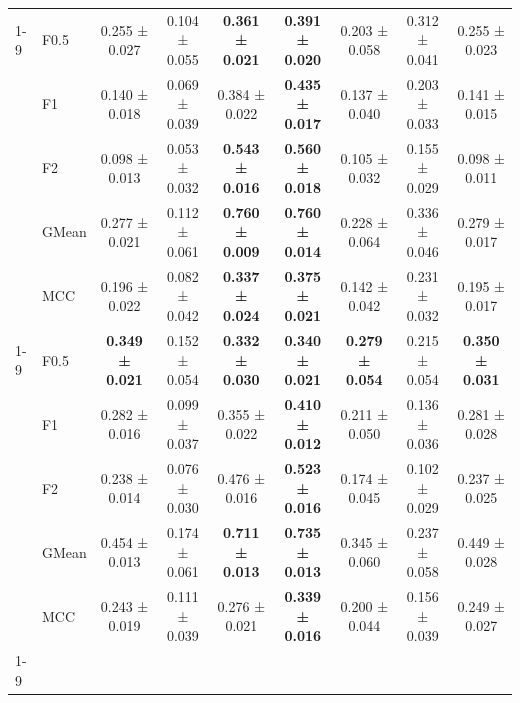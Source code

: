 \begin{table}[H]
{\begin{tabular}{llccccccc}
\cline{1-9}
\multirow[t]{5}{*}{TabPFN} & F0.5 & 0.255 ± 0.027 & 0.104 ± 0.055 & \textbf{0.361 ± 0.021} & \textbf{0.391 ± 0.020} & 0.203 ± 0.058 & 0.312 ± 0.041 & 0.255 ± 0.023 \\
 & F1 & 0.140 ± 0.018 & 0.069 ± 0.039 & 0.384 ± 0.022 & \textbf{0.435 ± 0.017} & 0.137 ± 0.040 & 0.203 ± 0.033 & 0.141 ± 0.015 \\
 & F2 & 0.098 ± 0.013 & 0.053 ± 0.032 & \textbf{0.543 ± 0.016} & \textbf{0.560 ± 0.018} & 0.105 ± 0.032 & 0.155 ± 0.029 & 0.098 ± 0.011 \\
 & GMean & 0.277 ± 0.021 & 0.112 ± 0.061 & \textbf{0.760 ± 0.009} & \textbf{0.760 ± 0.014} & 0.228 ± 0.064 & 0.336 ± 0.046 & 0.279 ± 0.017 \\
 & MCC & 0.196 ± 0.022 & 0.082 ± 0.042 & \textbf{0.337 ± 0.024} & \textbf{0.375 ± 0.021} & 0.142 ± 0.042 & 0.231 ± 0.032 & 0.195 ± 0.017 \\
\cline{1-9}
\multirow[t]{5}{*}{XGBoost} & F0.5 & \textbf{0.349 ± 0.021} & 0.152 ± 0.054 & \textbf{0.332 ± 0.030} & \textbf{0.340 ± 0.021} & \textbf{0.279 ± 0.054} & 0.215 ± 0.054 & \textbf{0.350 ± 0.031} \\
 & F1 & 0.282 ± 0.016 & 0.099 ± 0.037 & 0.355 ± 0.022 & \textbf{0.410 ± 0.012} & 0.211 ± 0.050 & 0.136 ± 0.036 & 0.281 ± 0.028 \\
 & F2 & 0.238 ± 0.014 & 0.076 ± 0.030 & 0.476 ± 0.016 & \textbf{0.523 ± 0.016} & 0.174 ± 0.045 & 0.102 ± 0.029 & 0.237 ± 0.025 \\
 & GMean & 0.454 ± 0.013 & 0.174 ± 0.061 & \textbf{0.711 ± 0.013} & \textbf{0.735 ± 0.013} & 0.345 ± 0.060 & 0.237 ± 0.058 & 0.449 ± 0.028 \\
 & MCC & 0.243 ± 0.019 & 0.111 ± 0.039 & 0.276 ± 0.021 & \textbf{0.339 ± 0.016} & 0.200 ± 0.044 & 0.156 ± 0.039 & 0.249 ± 0.027 \\
\cline{1-9}
\bottomrule
\end{tabular}
    }
\end{table}
